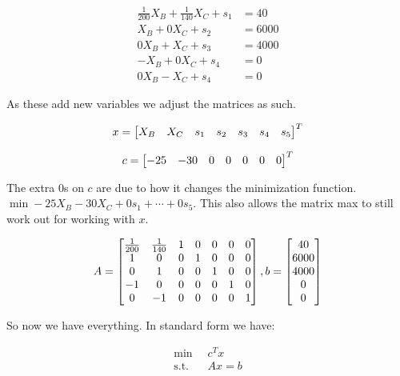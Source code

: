 \begin{align*}
	\frac{1}{200} X_B + \frac{1}{140}X_C + s_1 &= 40 \\
	X_B + 0X_C + s_2 &= 6000 \\
	0X_B + X_C + s_3 &= 4000 \\
	-X_B + 0X_C + s_4 &= 0 \\
	0X_B - X_C + s_4 &= 0
\end{align*}

As these add new variables we adjust the matrices as such.

\[x = \m{b}{X_B & X_C & s_1 & s_2 & s_3 & s_4 & s_5}^T\]

\[c = \m{b}{-25 & -30 & 0 & 0 & 0 & 0 & 0}^T\]

The extra 0s on $c$ are due to how it changes the minimization function. $\min -25X_B - 30X_C + 0s_1 + \cdots + 0s_5$. This also allows the matrix max to still work out for working with $x$.

\[
	A = \m{b}{\frac{1}{200} & \frac{1}{140} & 1 & 0 & 0 & 0 & 0 \\ 
	1 & 0 & 0 & 1 & 0 & 0 & 0 \\
	0 & 1 & 0 & 0 & 1 & 0 & 0\\ 
	-1 & 0 & 0 & 0 & 0 & 1 & 0\\ 
	0 & -1 & 0 & 0 & 0 & 0 & 1}, 
	b = \m{b}{40 \\ 6000 \\ 4000 \\ 0 \\ 0}
\]

So now we have everything. In standard form we have:

\begin{align*}
	\min \;\; & c^T x \\
	\text{s.t.} \;\; & Ax = b
\end{align*}


